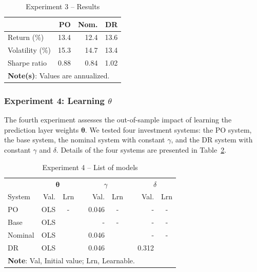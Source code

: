 \documentclass[10pt, twocolumn]{article}
\newcommand{\cmark}{\ding{51}}%
\newcommand{\xmark}{\ding{55}}%
\theoremstyle{plain}
\theoremstyle{definition}
\begin{document}
\begin{table}[t]
\caption{Experiment 3 -- Results}
\centering
\begin{tabular}{lrrr}
\toprule
& PO & Nom. & DR\\[0.5ex]
\midrule
Return (\%)     & 13.4 & 12.4 & 13.6\\
Volatility (\%) & 15.3 & 14.7 & 13.4\\
Sharpe ratio    & 0.88 & 0.84 & 1.02\\
\bottomrule
\multicolumn{4}{p{0.6\linewidth}}{\small\rule{0pt}{3ex}\textbf{Note(s)}:
  Values are annualized.}\\
\end{tabular}
\label{table:exp3_results}
\end{table}

\subsubsection{Experiment 4: Learning \texorpdfstring{\(\theta\)}{Lg}}\label{sec:learn_theta}

The fourth experiment assesses the out-of-sample impact of learning the 
prediction layer weights \(\bm{\theta}\). We tested four investment systems:
the PO system, the base system, the nominal system with constant \(\gamma\), 
and the DR system with constant \(\gamma\) and \(\delta\). Details of the 
four systems are presented in Table~\ref{table:exp4_models}.

\begin{table}[t]
\caption{Experiment 4 -- List of models}
\centering
\begin{tabular}{lrcr@{}rcr@{}rc}
\toprule
		& \multicolumn{2}{c}{\(\bm{\theta}\)} & & \multicolumn{2}{c}{\(\gamma\)} & & \multicolumn{2}{c}{\(\delta\)}\\[0.5ex] \cline{2-3} \cline{5-6} \cline{8-9}
\rule{0pt}{3ex}System 	& Val. 	& Lrn    && Val. & Lrn 	  && Val. & Lrn \\
\midrule
PO 		& OLS 	& -      &&	0.046 & -      && -     & -      \\[0.5ex]
Base 	& OLS 	& \cmark &&	-	  & -      && -     & -      \\[0.5ex]
Nominal	& OLS 	& \cmark &&	0.046 & \xmark && - 	& -      \\[0.5ex]
DR		& OLS 	& \cmark &&	0.046 & \xmark && 0.312 & \xmark \\[0.25ex]
\bottomrule
\multicolumn{9}{p{0.9\linewidth}}{\small\rule{0pt}{3ex}\textbf{Note}: Val, Initial value; Lrn, Learnable.}\\
\end{tabular}
\label{table:exp4_models}
\end{table}
\end{document}
